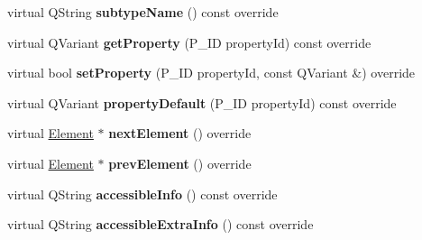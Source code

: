 \begin{DoxyCompactItemize}
virtual Q\+String {\bfseries subtype\+Name} () const override
\item 
\mbox{\label{class_ms_1_1_bar_line_ade5362ec4c34a325aa5cef4140ea4254}} 
virtual Q\+Variant {\bfseries get\+Property} (P\+\_\+\+ID property\+Id) const override
\item 
\mbox{\label{class_ms_1_1_bar_line_a04ee34558fd620ee3f329284f1b0badc}} 
virtual bool {\bfseries set\+Property} (P\+\_\+\+ID property\+Id, const Q\+Variant \&) override
\item 
\mbox{\label{class_ms_1_1_bar_line_ab79e59e9b455681f3dc56d3dc046264b}} 
virtual Q\+Variant {\bfseries property\+Default} (P\+\_\+\+ID property\+Id) const override
\item 
\mbox{\label{class_ms_1_1_bar_line_a70b800ab51f5370ac3edd2cea2ba7adc}} 
virtual \hyperlink{class_ms_1_1_element}{Element} $\ast$ {\bfseries next\+Element} () override
\item 
\mbox{\label{class_ms_1_1_bar_line_a7bcc2e0650a1f171d93a97af1b511932}} 
virtual \hyperlink{class_ms_1_1_element}{Element} $\ast$ {\bfseries prev\+Element} () override
\item 
\mbox{\label{class_ms_1_1_bar_line_a10414d116d257ae4b30d49d238d9bafc}} 
virtual Q\+String {\bfseries accessible\+Info} () const override
\item 
\mbox{\label{class_ms_1_1_bar_line_a4228fd0b05f42fae4a36223293e35f0d}} 
virtual Q\+String {\bfseries accessible\+Extra\+Info} () const override
\end{DoxyCompactItemize}
